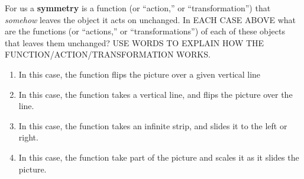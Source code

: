 \documentclass[noauthor,nooutcomes,12pt,handout]{ximera}
\begin{document}
\begin{question}
  For us a \textbf{symmetry} is a function (or ``action,'' or
  ``transformation'') that \textit{somehow} leaves the object it acts
  on unchanged.  In EACH CASE ABOVE what are the functions (or
  ``actions,'' or ``transformations'') of each of these objects that
  leaves them unchanged? USE WORDS TO EXPLAIN HOW THE FUNCTION/ACTION/TRANSFORMATION WORKS.
  \begin{freeResponse}
  \begin{enumerate}
  \item In this case, the function flips the picture over a given
    vertical line
  \item In this case, the function takes a vertical line, and flips the picture over the line.
  \item In this case, the function takes an infinite strip, and slides it to the left or right.
  \item In this case, the function take part of the picture and scales
    it as it slides the picture.
  \end{enumerate}
  \end{freeResponse}
  
\end{question}
\end{document}
